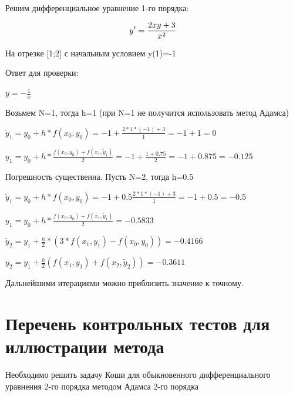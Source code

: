 Решим дифференциальное уравнение 1-го порядка:

\begin{equation}
	y'=\frac{2xy+3}{x^{2}} \\
\end{equation}

На отрезке [1;2] с начальным условием y(1)=-1

Ответ для проверки:

\begin{math}
	y=-\frac{1}{x}
\end{math}

Возьмем N=1, тогда h=1 (при N=1 не получится использовать метод Адамса)

\begin{math}
      \tilde y_{1}=y_{0}+h*f(x_{0},y_{0})=-1+\frac{2*1*(-1)+3}{1}=-1+1=0   
\end{math}

\begin{math}
	y_{1}=y_{0}+h*\frac{f(x_{0},y_{0})+f(x_{1},\tilde y_{1})}{2}= -1+\frac{1+0.75}{2}=-1+0.875=-0.125
\end{math}

Погрешность существенна. Пусть N=2, тогда h=0.5

\begin{math}
	\tilde y_{1}=y_{0}+h*f(x_{0},y_{0})=-1+0.5\frac{2*1*(-1)+3}{1}=-1+0.5=-0.5   
\end{math}

\begin{math}
	y_{1}=y_{0}+h*\frac{f(x_{0},y_{0})+f(x_{1},\tilde y_{1})}{2}=-0.5833
\end{math}

\begin{math}
	\tilde y_{2}=y_{1}+\frac{h}{2}*(3*f(x_{1},y_{1})-f(x_{0},y_{0}))=-0.4166   
\end{math}

\begin{math}
	y_{2}=y_{1}+\frac{h}{2} (f(x_{1},y_{1})+f(x_{2},\tilde y_{2}))=-0.3611
\end{math}
 
Дальнейшими итерациями можно приблизить значение к точному.
  
\section{Перечень контрольных тестов для иллюстрации метода}

 Необходимо решить задачу Коши для обыкновенного дифференциального уравнения 2-го порядка методом Адамса 2-го порядка
 
